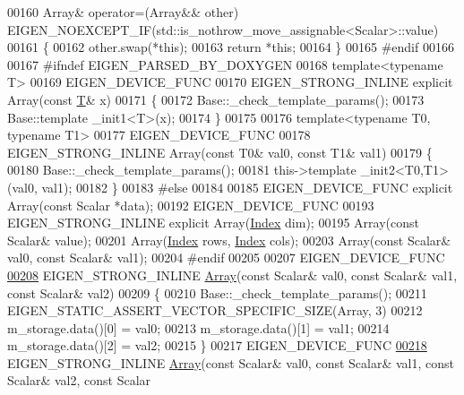 \begin{DoxyCode}
00160     Array& operator=(Array&& other) EIGEN\_NOEXCEPT\_IF(std::is\_nothrow\_move\_assignable<Scalar>::value)
00161     \{
00162       other.swap(*\textcolor{keyword}{this});
00163       \textcolor{keywordflow}{return} *\textcolor{keyword}{this};
00164     \}
00165 \textcolor{preprocessor}{#endif}
00166 
00167 \textcolor{preprocessor}{    #ifndef EIGEN\_PARSED\_BY\_DOXYGEN}
00168     \textcolor{keyword}{template}<\textcolor{keyword}{typename} T>
00169     EIGEN\_DEVICE\_FUNC
00170     EIGEN\_STRONG\_INLINE \textcolor{keyword}{explicit} Array(\textcolor{keyword}{const} \hyperlink{group___sparse_core___module}{T}& x)
00171     \{
00172       Base::\_check\_template\_params();
00173       Base::template \_init1<T>(x);
00174     \}
00175 
00176     \textcolor{keyword}{template}<\textcolor{keyword}{typename} T0, \textcolor{keyword}{typename} T1>
00177     EIGEN\_DEVICE\_FUNC
00178     EIGEN\_STRONG\_INLINE Array(\textcolor{keyword}{const} T0& val0, \textcolor{keyword}{const} T1& val1)
00179     \{
00180       Base::\_check\_template\_params();
00181       this->\textcolor{keyword}{template} \_init2<T0,T1>(val0, val1);
00182     \}
00183 \textcolor{preprocessor}{    #else}
00184 
00185     EIGEN\_DEVICE\_FUNC \textcolor{keyword}{explicit} Array(\textcolor{keyword}{const} Scalar *data);
00192     EIGEN\_DEVICE\_FUNC
00193     EIGEN\_STRONG\_INLINE \textcolor{keyword}{explicit} Array(\hyperlink{namespace_eigen_a62e77e0933482dafde8fe197d9a2cfde}{Index} dim);
00195     Array(\textcolor{keyword}{const} Scalar& value);
00201     Array(\hyperlink{namespace_eigen_a62e77e0933482dafde8fe197d9a2cfde}{Index} rows, \hyperlink{namespace_eigen_a62e77e0933482dafde8fe197d9a2cfde}{Index} cols);
00203     Array(\textcolor{keyword}{const} Scalar& val0, \textcolor{keyword}{const} Scalar& val1);
00204 \textcolor{preprocessor}{    #endif}
00205 
00207     EIGEN\_DEVICE\_FUNC
\hyperlink{group___core___module_adefff5a86babb44c362bd799c1cda965}{00208}     EIGEN\_STRONG\_INLINE \hyperlink{group___core___module_adefff5a86babb44c362bd799c1cda965}{Array}(\textcolor{keyword}{const} Scalar& val0, \textcolor{keyword}{const} Scalar& val1, \textcolor{keyword}{const} Scalar& val2)
00209     \{
00210       Base::\_check\_template\_params();
00211       EIGEN\_STATIC\_ASSERT\_VECTOR\_SPECIFIC\_SIZE(Array, 3)
00212       m\_storage.data()[0] = val0;
00213       m\_storage.data()[1] = val1;
00214       m\_storage.data()[2] = val2;
00215     \}
00217     EIGEN\_DEVICE\_FUNC
\hyperlink{group___core___module_ad4d80ab64904b4b4e8e59d8a96f659b4}{00218}     EIGEN\_STRONG\_INLINE \hyperlink{group___core___module_ad4d80ab64904b4b4e8e59d8a96f659b4}{Array}(\textcolor{keyword}{const} Scalar& val0, \textcolor{keyword}{const} Scalar& val1, \textcolor{keyword}{const} Scalar& val2, \textcolor{keyword}{const} Scalar

\end{DoxyCode}
